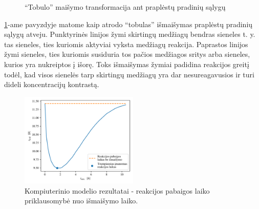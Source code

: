 \begin{figure}[!h]
    \caption{\enquote{Tobulo} maišymo transformacija ant praplėstų pradinių sąlygų}
    \label{perfect-4x4-mix}
    \end{figure}

    \ref{perfect-4x4-mix}-ame pavyzdyje matome kaip atrodo \enquote{tobulas} išmaišymas praplėstų pradinių sąlygų atveju. Punktyrinės linijos žymi skirtingų medžiagų bendras sieneles t. y. tas sieneles, ties kuriomis aktyviai vyksta medžiagų reakcija. Paprastos linijos žymi sieneles, ties kuriomis susiduria tos pačios medžiagos sritys arba sieneles, kurios yra nukreiptos į išorę. Toks išmaišymas žymiai padidina reakcijos greitį todėl, kad visos sienelės tarp skirtingų medžiagų yra dar nesureagavusios ir turi dideli koncentracijų kontrastą.

    \newpage

    \begin{figure}[h!]
        \centering
        \includegraphics[width=0.5\textwidth]{../paper/assets/mix-end-large-1.png}
    
        \caption{Kompiuterinio modelio rezultatai - reakcijos pabaigos laiko priklausomybė nuo išmaišymo laiko. }
    
        \label{mix-end-large}
    \end{figure}
